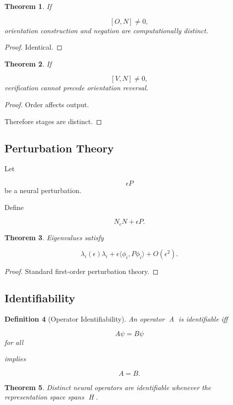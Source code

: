 \documentclass[12pt]{article}
\newtheorem{theorem}{Theorem}[section]
\newtheorem{definition}[theorem]{Definition}
\theoremstyle{remark}
\begin{document}
\begin{theorem}
If

\[
[O,N]\neq0,
\]
orientation construction and negation are computationally distinct.
\end{theorem}

\begin{proof}
Identical.
\end{proof}

\begin{theorem}
If

\[
[V,N]\neq0,
\]
verification cannot precede orientation reversal.
\end{theorem}

\begin{proof}
Order affects output.

Therefore stages are distinct.
\end{proof}

\subsection{Perturbation Theory}

Let

\[
\epsilon P
\]
be a neural perturbation.

Define

\[
N_\epsilon
N+\epsilon P.
\]

\begin{theorem}
Eigenvalues satisfy

\[
\lambda_i(\epsilon)
\lambda_i
+
\epsilon
\langle\phi_i,P\phi_i\rangle
+
O(\epsilon^2).
\]
\end{theorem}

\begin{proof}
Standard first-order perturbation theory.
\end{proof}

\subsection{Identifiability}

\begin{definition}[Operator Identifiability]
An operator A is identifiable iff

\[
A\psi=B\psi
\]
for all \psi

implies

\[
A=B.
\]
\end{definition}
\begin{theorem}
Distinct neural operators are identifiable whenever the representation space spans \mathcal H.
\end{theorem}
\end{document}
